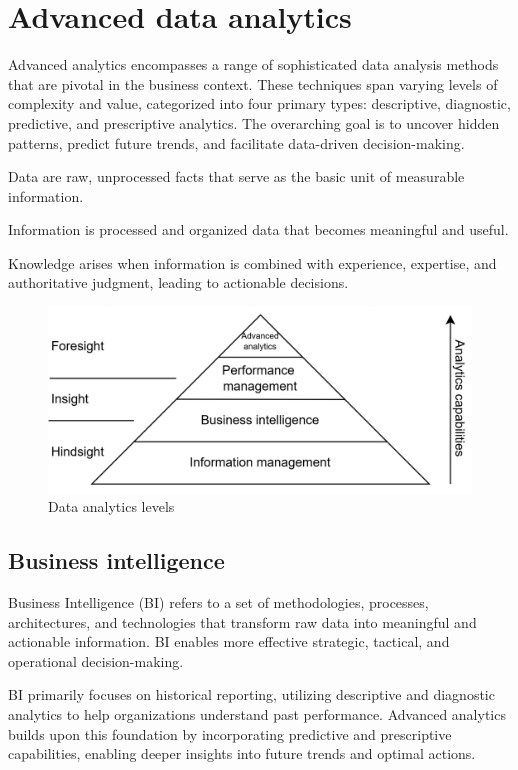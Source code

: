 \section{Advanced data analytics}

Advanced analytics encompasses a range of sophisticated data analysis methods that are pivotal in the business context. 
These techniques span varying levels of complexity and value, categorized into four primary types: descriptive, diagnostic, predictive, and prescriptive analytics.
The overarching goal is to uncover hidden patterns, predict future trends, and facilitate data-driven decision-making.

\begin{definition}
    Data are raw, unprocessed facts that serve as the basic unit of measurable information.
\end{definition}
\begin{definition}
    Information is processed and organized data that becomes meaningful and useful.
\end{definition}
\begin{definition}
    Knowledge arises when information is combined with experience, expertise, and authoritative judgment, leading to actionable decisions.
\end{definition}

\begin{figure}[H]
    \centering
    \includegraphics[width=0.5\linewidth]{images/bis5.png}
    \caption{Data analytics levels}
\end{figure}

\subsection{Business intelligence}
Business Intelligence (BI) refers to a set of methodologies, processes, architectures, and technologies that transform raw data into meaningful and actionable information. 
BI enables more effective strategic, tactical, and operational decision-making.

BI primarily focuses on historical reporting, utilizing descriptive and diagnostic analytics to help organizations understand past performance.
Advanced analytics builds upon this foundation by incorporating predictive and prescriptive capabilities, enabling deeper insights into future trends and optimal actions.

